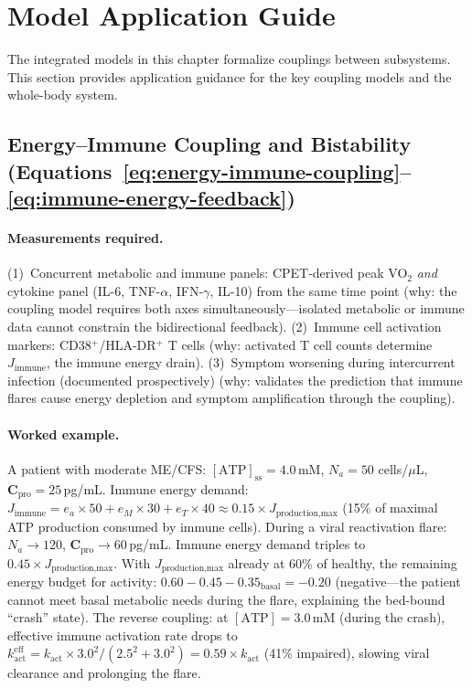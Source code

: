 \section{Model Application Guide}
\label{sec:integrated-model-application}

The integrated models in this chapter formalize couplings between subsystems. This section provides application guidance for the key coupling models and the whole-body system.

\subsection{Energy--Immune Coupling and Bistability (Equations~\ref{eq:energy-immune-coupling}--\ref{eq:immune-energy-feedback})}

\paragraph{Measurements required.}
(1)~Concurrent metabolic and immune panels: CPET-derived peak VO$_2$ \emph{and} cytokine panel (IL-6, TNF-$\alpha$, IFN-$\gamma$, IL-10) from the same time point (why: the coupling model requires both axes simultaneously---isolated metabolic or immune data cannot constrain the bidirectional feedback).
(2)~Immune cell activation markers: CD38$^+$/HLA-DR$^+$ T cells (why: activated T cell counts determine $J_{\text{immune}}$, the immune energy drain).
(3)~Symptom worsening during intercurrent infection (documented prospectively) (why: validates the prediction that immune flares cause energy depletion and symptom amplification through the coupling).

\paragraph{Worked example.}
A patient with moderate ME/CFS: $[\text{ATP}]_{\text{ss}} = 4.0$\,mM, $N_a = 50$ cells/$\mu$L, $\boldsymbol{C}_{\text{pro}} = 25$\,pg/mL. Immune energy demand: $J_{\text{immune}} = e_a \times 50 + e_M \times 30 + e_T \times 40 \approx 0.15 \times J_{\text{production,max}}$ (15\% of maximal ATP production consumed by immune cells). During a viral reactivation flare: $N_a \to 120$, $\boldsymbol{C}_{\text{pro}} \to 60$\,pg/mL. Immune energy demand triples to $0.45 \times J_{\text{production,max}}$. With $J_{\text{production,max}}$ already at 60\% of healthy, the remaining energy budget for activity: $0.60 - 0.45 - 0.35_{\text{basal}} = -0.20$ (negative---the patient cannot meet basal metabolic needs during the flare, explaining the bed-bound ``crash'' state). The reverse coupling: at $[\text{ATP}] = 3.0$\,mM (during the crash), effective immune activation rate drops to $k_{\text{act}}^{\text{eff}} = k_{\text{act}} \times 3.0^2/(2.5^2 + 3.0^2) = 0.59 \times k_{\text{act}}$ (41\% impaired), slowing viral clearance and prolonging the flare.

